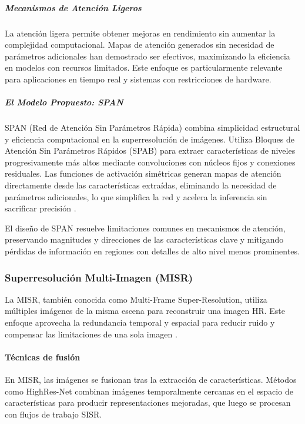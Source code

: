     
                \subparagraph{Mecanismos de Atención Ligeros}
                    
                    La atención ligera permite obtener mejoras en rendimiento sin aumentar la complejidad computacional. Mapas de atención generados sin necesidad de parámetros adicionales \autocite{[7]choe2019attention, [17]haase2020rethinking} han demostrado ser efectivos, maximizando la eficiencia en modelos con recursos limitados. Este enfoque es particularmente relevante para aplicaciones en tiempo real y sistemas con restricciones de hardware.
    
                \subparagraph{El Modelo Propuesto: SPAN}

                    SPAN (Red de Atención Sin Parámetros Rápida) combina simplicidad estructural y eficiencia computacional en la superresolución de imágenes. Utiliza Bloques de Atención Sin Parámetros Rápidos (SPAB) para extraer características de niveles progresivamente más altos mediante convoluciones con núcleos fijos y conexiones residuales. Las funciones de activación simétricas generan mapas de atención directamente desde las características extraídas, eliminando la necesidad de parámetros adicionales, lo que simplifica la red y acelera la inferencia sin sacrificar precisión \autocite{wan2024swift}.

                    El diseño de SPAN resuelve limitaciones comunes en mecanismos de atención, preservando magnitudes y direcciones de las características clave y mitigando pérdidas de información en regiones con detalles de alto nivel menos prominentes.

        \subsubsection{Superresolución Multi-Imagen (MISR)}
    
            La MISR, también conocida como Multi-Frame Super-Resolution, utiliza múltiples imágenes de la misma escena para reconstruir una imagen HR. Este enfoque aprovecha la redundancia temporal y espacial para reducir ruido y compensar las limitaciones de una sola imagen \autocite{deudon2020highres, kawulok2021deep}.
    
            \paragraph{Técnicas de fusión}
    
                En MISR, las imágenes se fusionan tras la extracción de características. Métodos como HighRes-Net \autocite{deudon2020highres} combinan imágenes temporalmente cercanas en el espacio de características para producir representaciones mejoradas, que luego se procesan con flujos de trabajo SISR.
    
